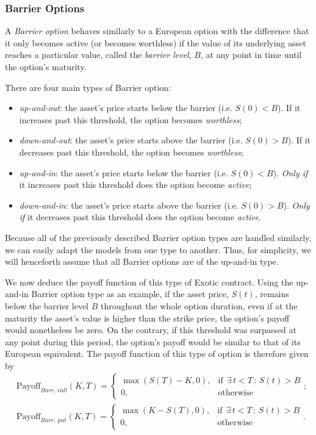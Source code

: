 \subsubsection{Barrier Options}
\label{subsubsection:Barrier Options}
A \emph{Barrier option} behaves similarly to a European option with the difference that it only becomes active (or becomes worthless) if the value of its underlying asset reaches a particular value, called the \emph{barrier level}, $B$, at any point in time until the option's maturity.

There are four main types of Barrier option:
\begin{itemize}
\item \emph{up-and-out}: the asset's price starts below the barrier (i.e. $S(0)<B$). If it increases past this threshold, the option becomes \emph{worthless};
\item \emph{down-and-out}: the asset's price starts above the barrier (i.e. $S(0)>B$). If it decreases past this threshold, the option becomes \emph{worthless};
\item \emph{up-and-in}: the asset's price starts below the barrier (i.e. $S(0)<B$). \emph{Only if} it increases past this threshold does the option become \emph{active};
\item \emph{down-and-in}: the asset's price starts above the barrier (i.e. $S(0)>B$). \emph{Only if} it decreases past this threshold does the option become \emph{active}.
\end{itemize}

Because all of the previously described Barrier option types are handled similarly, we can easily adapt the models from one type to another. Thus, for simplicity, we will henceforth assume that all Barrier options are of the up-and-in type.

We now deduce the payoff function of this type of Exotic contract. Using the up-and-in Barrier option type as an example, if the asset price, $S(t)$, remains below the barrier level $B$ throughout the whole option duration, even if at the maturity the asset's value is higher than the strike price, the option's payoff would nonetheless be zero. On the contrary, if this threshold was surpassed at any point during this period, the option's payoff would be similar to that of its European equivalent.
The payoff function of this type of option is therefore given by
\begin{subequations}\label{barrier}
\begin{align}
&\text{Payoff}_{Barr,\ call}(K,T)=\begin{cases} 
      \max\left(S(T)-K,0\right), & \mathrm{if}\ \ \exists\,t<T\,:\,S(t)>B\\
      0, & \mathrm{otherwise}
   \end{cases};\\
&\text{Payoff}_{Barr,\ put}(K,T)=\begin{cases} 
      \max\left(K-S(T),0\right), & \mathrm{if}\ \ \exists\,t<T\,:\,S(t)>B\\
      0, & \mathrm{otherwise}
   \end{cases}.
\end{align}
\end{subequations}


